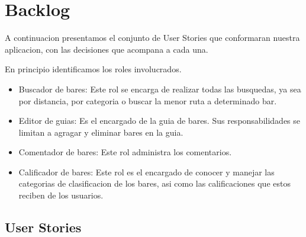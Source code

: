 \section{Backlog}
A continuacion presentamos el conjunto de User Stories que conformaran nuestra aplicacion, con las decisiones que acompana a cada una.

En principio identificamos los roles involucrados.
\begin{itemize}
 \item Buscador de bares: Este rol se encarga de realizar todas las busquedas, ya sea por distancia, por categoria o buscar la menor ruta a determinado bar.
 \item Editor de guias: Es el encargado de la guia de bares. Sus responsabilidades se limitan a agragar y eliminar bares en la guia.
 \item Comentador de bares: Este rol administra los comentarios.
 \item Calificador de bares: Este rol es el encargado de conocer y manejar las categorias de clasificacion de los bares, asi como las calificaciones que estos reciben de los usuarios.
\end{itemize}

\subsection{User Stories}

